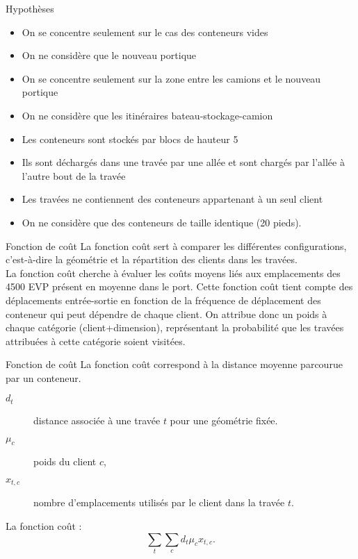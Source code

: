 \begin{frame}{Hypothèses}
  \begin{itemize}
  \item On se concentre seulement sur le cas des conteneurs vides
    \vfill
  \item On ne considère que le nouveau portique
    \vfill
  \item On se concentre seulement sur la zone entre les camions et le nouveau portique
    \vfill
  \item On ne considère que les itinéraires bateau-stockage-camion
    \vfill
  \item Les conteneurs sont stockés par blocs de hauteur 5
    \vfill
  \item Ils sont déchargés dans une travée par une allée et sont chargés par l'allée à l'autre bout de la travée
    \vfill
  \item Les travées ne contiennent des conteneurs appartenant à un seul client
    \vfill
  \item On ne considère que des conteneurs de taille identique (20 pieds).
  \end{itemize}
  \vfill
\end{frame}

\begin{frame}{Fonction de coût}
  \vfill
  La fonction coût sert à comparer les différentes configurations, c'est-à-dire la géométrie et la répartition des clients dans les travées.\\
  \vfill
  La fonction coût cherche à évaluer les coûts moyens liés aux emplacements des 4500 EVP présent en moyenne dans le port.
  Cette fonction coût tient compte des déplacements entrée-sortie en fonction de la fréquence de déplacement des conteneur qui peut dépendre de chaque client.
  \vfill
  On attribue donc un poids à chaque catégorie (client+dimension), représentant la probabilité que les travées attribuées à cette catégorie soient visitées.
\end{frame}

\begin{frame}{Fonction de coût}
  La fonction coût correspond à la distance moyenne parcourue par un conteneur.
  \begin{description}
  \item[$d_t$] distance associée à une travée $t$ pour une géométrie fixée.
  \item[$\mu_c$] poids du client $c$,
  \item[$x_{t,c}$] nombre d'emplacements utilisés par le client dans la travée $t$.
  \end{description}
  \vfill
  La fonction coût  : 
  $$ \sum_t \sum_c d_t\mu_c x_{t,c}.  $$
  \vfill
\end{frame}

